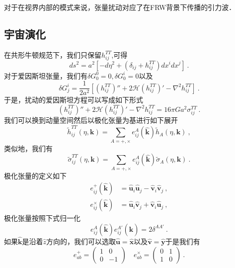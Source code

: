 对于在视界内部的模式来说，张量扰动对应了在FRW背景下传播的引力波．

\subsection{宇宙演化}
在共形牛顿规范下，我们只保留$h_{ij}^{TT}$,可得
\begin{equation}
ds^2 = a^2[-d  \eta^2+(\delta_{ij}+h_{ij}^{TT})dx^i dx^j ]~.
\end{equation}
对于爱因斯坦张量，我们有$\delta G^0_0 = 0, \delta G^i_0 = 0$以及
\begin{equation}
\delta G^i_j = \frac{1}{2 a^2} [ (h_{ij}^{TT}  )'' + 2\mathcal H (h_{ij}^{TT})' - \nabla^2 h_{ij}^{TT}  ]~.
\end{equation}
于是，扰动的爱因斯坦方程可以写成如下形式
\begin{equation}\label{TenPT_eq1}
(h_{ij}^{TT})'' + 2 \mathcal H (h_{ij}^{TT})' - \nabla^2 h_{ij}^{TT} = 16 \pi G a^2 \sigma_{ij}^{TT} ~.
\end{equation}
我们可以换到动量空间然后以极化张量为基进行如下展开
\begin{equation}
\tilde h_{ij}^{TT} (\eta,\mathbf k) = \sum_{A = +,\times} e^A_{ij} (\hat{\mathbf k}) \tilde h_A (\eta,\mathbf k)~, 
\end{equation}
类似地，我们有
\begin{equation}
\tilde \sigma_{ij}^{TT} (\eta,\mathbf k) = \sum_{A = +,\times} e^A_{ij} (\hat{\mathbf k}) \tilde \sigma_A (\eta,\mathbf k) ~.
\end{equation}
极化张量的定义如下
\begin{equation}
\begin{aligned}
e^+_{ij}(\hat{\mathbf k}) & = \hat{\mathbf u}_i \hat{\mathbf u}_j - \hat{\mathbf v}_i \hat{\mathbf v}_j ~, \\
e^\times_{ij} (\hat{\mathbf k}) & = \hat{\mathbf u}_i 
\hat{\mathbf v}_j + \hat{\mathbf v}_i \hat{\mathbf u}_j~,
\end{aligned}
\end{equation}
极化张量按照下式归一化
\begin{equation}
e^A_{ij} (\hat{\mathbf k}) e^{A'}_{ij} (\hat{\mathbf k}) = 2 \delta^{AA'} ~.
\end{equation}
如果$\hat{\mathbf k}$是沿着$\hat z$方向的，我们可以选取$\hat{\mathbf u} = \hat{\mathbf x}$以及$\hat{\mathbf v} = \hat{\mathbf y}$于是我们有
\begin{equation}
e^+_{ab} = \begin{pmatrix}
1 & 0 \\
0 & -1 
\end{pmatrix} \quad 
e^\times_{ab} = \begin{pmatrix}
0 & 1 \\
1 & 0
\end{pmatrix}
~.
\end{equation}
